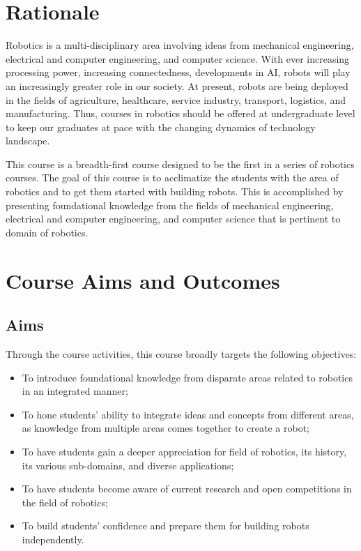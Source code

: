 \documentclass[a4paper,11pt]{article}
\begin{document}
\section{Rationale}
Robotics is a multi-disciplinary area involving ideas from mechanical engineering, electrical and computer engineering, and computer science. With ever increasing processing power, increasing connectedness, developments in AI, robots will play an increasingly greater role in our society. At present, robots are being deployed in the fields of agriculture, healthcare, service industry, transport, logistics, and manufacturing. Thus, courses in robotics should be offered at undergraduate level to keep our graduates at pace with the changing dynamics of technology landscape. 

This course is a breadth-first course designed to be the first in a series of robotics courses. The goal of this course is to acclimatize the students with the area of robotics and to get them started with building robots. This is accomplished by presenting foundational knowledge from the fields of mechanical engineering, electrical and computer engineering, and computer science that is pertinent to domain of robotics. 

\section{Course Aims and Outcomes}
\subsection{Aims}
Through the course activities, this course broadly targets the following objectives:
\begin{itemize}
	\item To introduce foundational knowledge from disparate areas related to robotics in an integrated manner;
	\item To hone students' ability to integrate ideas and concepts from different areas, as knowledge from multiple areas comes together to create a robot;
	\item To have students gain a deeper appreciation for field of robotics, its history, its various sub-domains, and diverse applications;
	\item To have students become aware of current research and open competitions in the field of robotics;
	\item To build students' confidence and prepare them for building robots independently.
\end{itemize}
\end{document}
